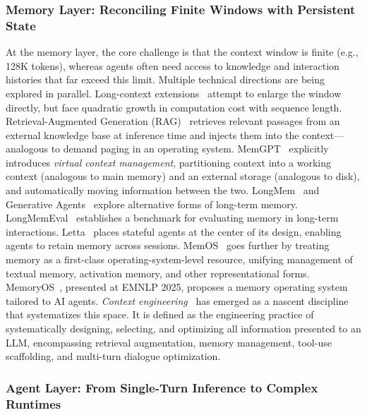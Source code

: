 \documentclass[11pt,a4paper]{article}
\begin{document}
\subsubsection{Memory Layer: Reconciling Finite Windows with Persistent State}

At the memory layer, the core challenge is that the context window is finite (e.g., 128K tokens), whereas agents often need access to knowledge and interaction histories that far exceed this limit.
Multiple technical directions are being explored in parallel.
Long-context extensions~\cite{gemini2024,yarn2024} attempt to enlarge the window directly, but face quadratic growth in computation cost with sequence length.
Retrieval-Augmented Generation (RAG)~\cite{lewis2020rag} retrieves relevant passages from an external knowledge base at inference time and injects them into the context---analogous to demand paging in an operating system.
MemGPT~\cite{memgpt2023} explicitly introduces \textit{virtual context management}, partitioning context into a working context (analogous to main memory) and an external storage (analogous to disk), and automatically moving information between the two.
LongMem~\cite{longmem2023} and Generative Agents~\cite{park2023generativeagents} explore alternative forms of long-term memory.
LongMemEval~\cite{longmemeval2024} establishes a benchmark for evaluating memory in long-term interactions.
Letta~\cite{letta_stateful_2026} places stateful agents at the center of its design, enabling agents to retain memory across sessions.
MemOS~\cite{memos2025} goes further by treating memory as a first-class operating-system-level resource, unifying management of textual memory, activation memory, and other representational forms.
MemoryOS~\cite{memoryos2025}, presented at EMNLP 2025, proposes a memory operating system tailored to AI agents.
\emph{Context engineering}~\cite{contextengineer_survey2025} has emerged as a nascent discipline that systematizes this space.
It is defined as the engineering practice of systematically designing, selecting, and optimizing all information presented to an LLM, encompassing retrieval augmentation, memory management, tool-use scaffolding, and multi-turn dialogue optimization.

\subsubsection{Agent Layer: From Single-Turn Inference to Complex Runtimes}
\end{document}
